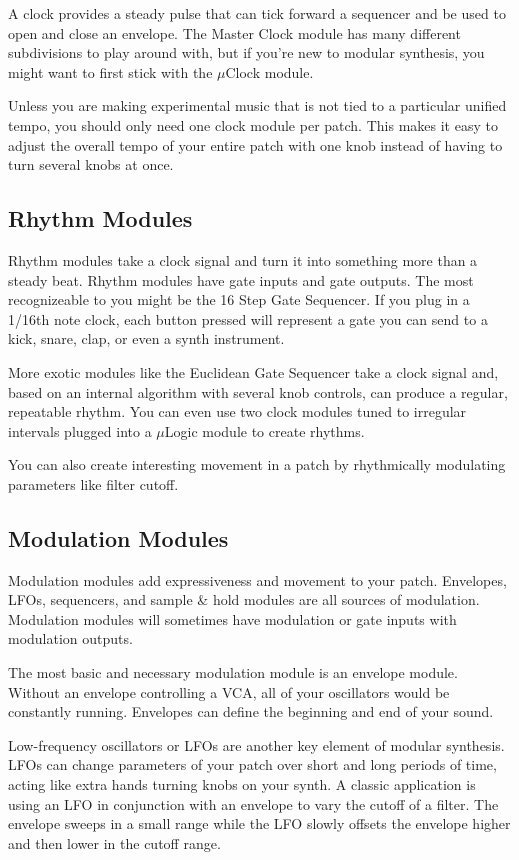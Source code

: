\documentclass[11pt]{book}
\begin{document}
\begin{multicols*}{2}
A clock provides a steady pulse that can tick forward a sequencer and be used to open and close an envelope. The Master Clock module has many different subdivisions to play around with, but if you're new to modular synthesis, you might want to first stick with the $\mu$Clock module.

Unless you are making experimental music that is not tied to a particular unified tempo, you should only need one clock module per patch. This makes it easy to adjust the overall tempo of your entire patch with one knob instead of having to turn several knobs at once.

\subsection{Rhythm Modules}

Rhythm modules take a clock signal and turn it into something more than a steady beat. Rhythm modules have gate inputs and gate outputs. The most recognizeable to you might be the 16 Step Gate Sequencer. If you plug in a 1/16th note clock, each button pressed will represent a gate you can send to a kick, snare, clap, or even a synth instrument.

More exotic modules like the Euclidean Gate Sequencer take a clock signal and, based on an internal algorithm with several knob controls, can produce a regular, repeatable rhythm. You can even use two clock modules tuned to irregular intervals plugged into a $\mu$Logic module to create rhythms.

You can also create interesting movement in a patch by rhythmically modulating parameters like filter cutoff.

\subsection{Modulation Modules}

Modulation modules add expressiveness and movement to your patch. Envelopes, LFOs, sequencers, and sample \& hold modules are all sources of modulation. Modulation modules will sometimes have modulation or gate inputs with modulation outputs.

The most basic and necessary modulation module is an envelope module. Without an envelope controlling a VCA, all of your oscillators would be constantly running. Envelopes can define the beginning and end of your sound.

Low-frequency oscillators or LFOs are another key element of modular synthesis. LFOs can change parameters of your patch over short and long periods of time, acting like extra hands turning knobs on your synth. A classic application is using an LFO in conjunction with an envelope to vary the cutoff of a filter. The envelope sweeps in a small range while the LFO slowly offsets the envelope higher and then lower in the cutoff range.


\end{multicols*}
\end{document}
